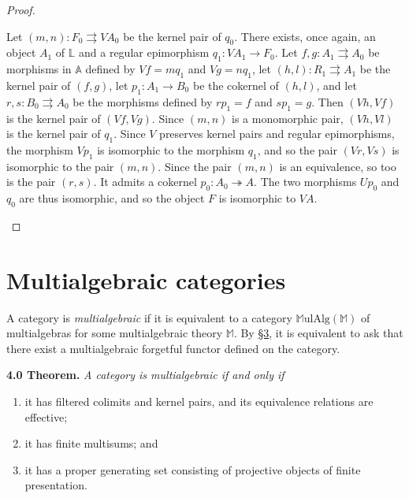 \documentclass{article}
\newenvironment{itenv}[1]
  {\phantomsection\par\medskip\noindent\textbf{#1.}\itshape}
  {\medskip}
\newcommand{\bb}[1]{{\mathbb{#1}}}
\newcommand{\MulAlg}{\mathbb{M}\mathrm{ulAlg}}
\begin{document}
\begin{proof}
\begin{enumerate}[a)]
      Let $(m,n)\colon F_0\rightrightarrows VA_0$ be the kernel pair of $q_0$.
      There exists, once again, an object $A_1$ of $\bb{L}$ and a regular epimorphism $q_1\colon VA_1\to F_0$.
      Let $f,g\colon A_1\rightrightarrows A_0$ be morphisms in $\bb{A}$ defined by $Vf=mq_1$ and $Vg=nq_1$, let $(h,l)\colon R_1\rightrightarrows A_1$ be the kernel pair of $(f,g)$, let $p_1\colon A_1\to B_0$ be the cokernel of $(h,l)$, and let $r,s\colon B_0\rightrightarrows A_0$ be the morphisms defined by $rp_1=f$ and $sp_1=g$.
      Then $(Vh,Vf)$ is the kernel pair of $(Vf,Vg)$.
      Since $(m,n)$ is a monomorphic pair, $(Vh,Vl)$ is the kernel pair of $q_1$.
      Since $V$ preserves kernel pairs and regular epimorphisms, the morphism $Vp_1$ is isomorphic to the morphism $q_1$, and so the pair $(Vr,Vs)$ is isomorphic to the pair $(m,n)$.
      Since the pair $(m,n)$ is an equivalence, so too is the pair $(r,s)$.
      It admits a cokernel $p_0\colon A_0\twoheadrightarrow A$.
      The two morphisms $Up_0$ and $q_0$ are thus isomorphic, and so the object $F$ is isomorphic to $VA$.
  \end{enumerate}
\end{proof}



\section{Multialgebraic categories}
\label{4}

A category is \emph{multialgebraic} if it is equivalent to a category $\MulAlg(\bb{M})$ of multialgebras for some multialgebraic theory $\bb{M}$.
By \hyperref[3]{\S3}, it is equivalent to ask that there exist a multialgebraic forgetful functor defined on the category.

\begin{itenv}{4.0 Theorem}
\label{4.0}
  A category is multialgebraic if and only if
  \begin{enumerate}[1)]
    \item it has filtered colimits and kernel pairs, and its equivalence relations are effective;
    \item it has finite multisums; and
    \item it has a proper generating set consisting of projective objects of finite presentation.
  \end{enumerate}
\end{itenv}
\end{document}
